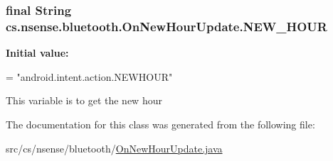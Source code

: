 \hypertarget{classcs_1_1nsense_1_1bluetooth_1_1_on_new_hour_update_a9a03ca7175289fcade7fba97599e1e97}{
\subsubsection[{N\-E\-W\-\_\-\-H\-O\-U\-R}]{\setlength{\rightskip}{0pt plus 5cm}final String cs.\-nsense.\-bluetooth.\-On\-New\-Hour\-Update.\-N\-E\-W\-\_\-\-H\-O\-U\-R\hspace{0.3cm}{\ttfamily [static]}}}\label{classcs_1_1nsense_1_1bluetooth_1_1_on_new_hour_update_a9a03ca7175289fcade7fba97599e1e97}
{\bfseries Initial value\-:}
\begin{DoxyCode}
=
            \textcolor{stringliteral}{"android.intent.action.NEWHOUR"}
\end{DoxyCode}
This variable is to get the new hour 

The documentation for this class was generated from the following file\-:\begin{DoxyCompactItemize}
\item 
src/cs/nsense/bluetooth/\hyperlink{_on_new_hour_update_8java}{On\-New\-Hour\-Update.\-java}\end{DoxyCompactItemize}
